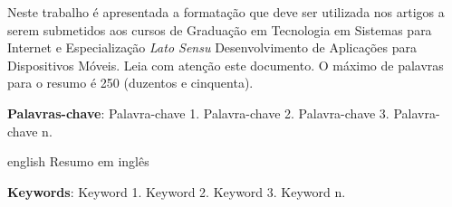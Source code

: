 \documentclass[
	article,			%
	11pt,				%
	oneside,			%
	a4paper,			%
	chapter=TITLE,		%
	section=TITLE,		%
	english,			%
	brazil,				%
	sumario=tradicional
]{abntex2}
\begin{document}
	
	
	\frenchspacing 
	
	
	\maketitle
	
	\begin{resumoumacoluna}
		Neste trabalho é apresentada a formatação que deve ser utilizada nos artigos a serem submetidos aos cursos de Graduação em Tecnologia em Sistemas para Internet e Especialização \textit{Lato Sensu} Desenvolvimento de Aplicações para Dispositivos Móveis. Leia com atenção este documento. O máximo de palavras para o resumo é 250 (duzentos e cinquenta). 
		
		\vspace{\onelineskip}
		
		\noindent
		\textbf{Palavras-chave}: Palavra-chave 1. Palavra-chave 2. Palavra-chave 3. Palavra-chave n.
	\end{resumoumacoluna}
	
    \renewcommand{\resumoname}{Abstract}
    \begin{resumoumacoluna}
        \begin{otherlanguage*}{english}
   	    	Resumo em inglês
   		
       		\vspace{\onelineskip}
   		
   	    	\noindent
   		   \textbf{Keywords}: Keyword 1. Keyword 2. Keyword 3. Keyword n.
      \end{otherlanguage*} 
   	\end{resumoumacoluna}
        
	
	\textual
	
\end{document}
